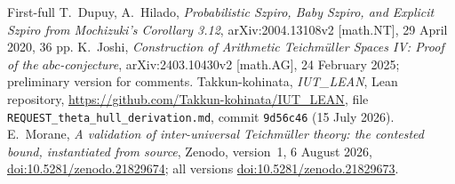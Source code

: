 \documentclass[11pt]{article}
\theoremstyle{plain}
\theoremstyle{definition}
\begin{document}
\begin{thebibliography}{First-full}
 T.~Dupuy, A.~Hilado, \emph{Probabilistic Szpiro, Baby Szpiro, and
 Explicit Szpiro from Mochizuki's Corollary 3.12}, arXiv:2004.13108v2 [math.NT],
 29 April 2020, 36 pp.
 K.~Joshi, \emph{Construction of Arithmetic Teichm\"uller
 Spaces IV: Proof of the $abc$-conjecture}, arXiv:2403.10430v2 [math.AG],
 24 February 2025; preliminary version for comments.
 Takkun-kohinata, \emph{IUT\_LEAN}, Lean repository,
 \url{https://github.com/Takkun-kohinata/IUT_LEAN}, file
 \texttt{REQUEST\_theta\_hull\_derivation.md}, commit \texttt{9d56c46} (15 July 2026).
 E.~Morane, \emph{A validation of inter-universal Teichm\"uller
 theory: the contested bound, instantiated from source}, Zenodo, version~1,
 6 August 2026, \href{https://doi.org/10.5281/zenodo.21829674}{doi:10.5281/zenodo.21829674};
 all versions \href{https://doi.org/10.5281/zenodo.21829673}{doi:10.5281/zenodo.21829673}.
\end{thebibliography}
\end{document}
